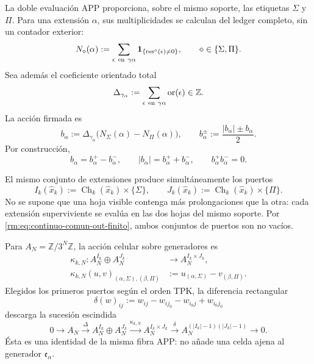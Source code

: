 La doble evaluación APP proporciona, sobre el mismo soporte, las etiquetas
\(\Sigma\) y \(\Pi\). Para una extensión \(\alpha\), sus multiplicidades
se calculan del ledger completo, sin un contador exterior:
\begin{equation}
\label{rm:eq:pdfv2-cor-multiplicidades-hojas}
 N_\diamond(\alpha):=
 \sum_{\epsilon\ {\rm en}\ \gamma\alpha}
 \mathbf1_{\{\operatorname{res}^{\diamond}(\epsilon)\neq0\}},
 \qquad \diamond\in\{\Sigma,\Pi\}.
\end{equation}
Sea además el coeficiente orientado total
\[
 \Delta_{\gamma_\alpha}:=
 \sum_{\epsilon\ {\rm en}\ \gamma\alpha}\operatorname{or}(\epsilon)
 \in\mathbb Z.
\]
La acción firmada es
\begin{equation}
\label{rm:eq:pdfv2-cor-b-alpha}
 b_\alpha:=\Delta_{\gamma_\alpha}
 \bigl(N_\Sigma(\alpha)-N_\Pi(\alpha)\bigr),
 \qquad
 b_\alpha^\pm:=\frac{|b_\alpha|\pm b_\alpha}{2}.
\end{equation}
Por construcción,
\begin{equation}
\label{rm:eq:pdfv2-cor-b-identidades}
 b_\alpha=b_\alpha^+-b_\alpha^-,\qquad
 |b_\alpha|=b_\alpha^++b_\alpha^-,\qquad
 b_\alpha^+b_\alpha^-=0.
\end{equation}

El mismo conjunto de extensiones produce simultáneamente los puertos
\begin{equation}
\label{rm:eq:pdfv2-cor-puertos-comunes}
 I_k(\widehat x_k):=
 \operatorname{Ch}_k(\widehat x_k)\times\{\Sigma\},
 \qquad
 J_k(\widehat x_k):=
 \operatorname{Ch}_k(\widehat x_k)\times\{\Pi\}.
\end{equation}
No se supone que una hoja visible contenga más prolongaciones que la otra:
cada extensión superviviente se evalúa en las dos hojas del mismo soporte.
Por \eqref{rm:eq:continuo-comun-out-finito}, ambos conjuntos de puertos son no
vacíos.

Para \(A_N=\mathbb Z/3^N\mathbb Z\), la acción celular sobre generadores es
\begin{equation}
\label{rm:eq:pdfv2-cor-kappa-celda}
 \begin{aligned}
 \kappa_{k,N}:A_N^{I_k}\oplus A_N^{J_k}
 &\longrightarrow A_N^{I_k\times J_k},\\
 \kappa_{k,N}(u,v)_{(\alpha,\Sigma),(\beta,\Pi)}
 &:=u_{(\alpha,\Sigma)}-v_{(\beta,\Pi)}.
 \end{aligned}
\end{equation}
Elegidos los primeros puertos según el orden TPK, la diferencia rectangular
\begin{equation}
\label{rm:eq:pdfv2-cor-delta-celda}
 \delta(w)_{ij}:=w_{ij}-w_{ij_0}-w_{i_0j}+w_{i_0j_0}
\end{equation}
descarga la sucesión escindida
\begin{equation}
\label{rm:eq:pdfv2-cor-sucesion-celda}
 0\longrightarrow A_N\xrightarrow{\Delta}
 A_N^{I_k}\oplus A_N^{J_k}
 \xrightarrow{\kappa_{k,N}}A_N^{I_k\times J_k}
 \xrightarrow{\delta}A_N^{(|I_k|-1)(|J_k|-1)}
 \longrightarrow0.
\end{equation}
Ésta es una identidad de la misma fibra APP: no añade una celda ajena al
generador \(\mathfrak e_\alpha\).

